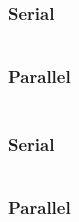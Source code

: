 \documentclass[parskip]{scrartcl}
\begin{document}
	\subsection{}
	\subsubsection{Serial}
	\inputminted	[linenos]{c}{ex2/b_ser.h}
	\subsubsection{Parallel}
	\inputminted	[linenos]{c}{ex2/b_par.h}
	\subsection{}
	\subsubsection{Serial}
	\inputminted	[linenos]{c}{ex2/c_ser.h}
	\subsubsection{Parallel}
	\inputminted	[linenos]{c}{ex2/c_par.h}
\end{document}
